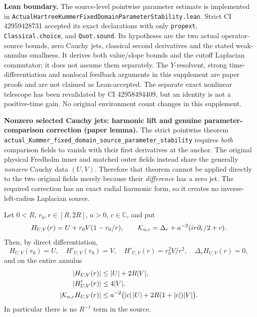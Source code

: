 \medskip
\noindent\textbf{Lean boundary.}
The source-level pointwise parameter estimate is implemented in
\texttt{ActualHartreeKummerFixedDomainParameterStability.lean}.
Strict CI 42959428731 accepted its exact declarations with only
\texttt{propext}, \texttt{Classical.choice}, and \texttt{Quot.sound}.
Its hypotheses are the two actual operator-source bounds, zero Cauchy
jets, classical second derivatives and the stated weak-annulus
smallness.  It derives both value/slope bounds and the cutoff Laplacian
commutator; it does not assume them separately.  The $Y$-resolvent,
strong time-differentiation and nonlocal feedback arguments in this
supplement are paper proofs and are not claimed as Lean-accepted.
The separate exact nonlinear telescope has been revalidated by
CI 42958494409, but an identity is not a positive-time gain.
No original environment count changes in this supplement.


\medskip
\noindent\textbf{Nonzero selected Cauchy jets: harmonic lift and genuine
parameter-comparison correction (paper lemma).}
The strict pointwise theorem
\texttt{actual\_Kummer\_fixed\_domain\_source\_parameter\_stability}
requires \emph{both} comparison fields to vanish with their first
derivatives at the anchor. The original physical Fredholm inner and
matched outer fields instead share the generally \emph{nonzero}
Cauchy data $(U,V)$. Therefore that theorem cannot be applied directly
to the two original fields merely because their \emph{difference}
has a zero jet. The required correction has an exact radial harmonic
form, so it creates no inverse-left-radius Laplacian source.

Let $0<R$, $r_0,r\in[R,2R]$, $a>0$, $c\in\mathbb C$, and put
\[
 H_{U,V}(r)=U+r_0V(1-r_0/r),\qquad
 {\cal K}_{a,c}=\Delta_r+a^{-2}(ir\partial_r/2+c).
\]
Then, by direct differentiation,
\[
 H_{U,V}(r_0)=U,\quad H'_{U,V}(r_0)=V,\quad
 H'_{U,V}(r)=r_0^2V/r^2,\quad
 \Delta_rH_{U,V}(r)=0,
\]
and on the entire annulus
\begin{align*}
 |H_{U,V}(r)|&\le |U|+2R|V|,\\
 |H'_{U,V}(r)|&\le4|V|,\\
 |{\cal K}_{a,c}H_{U,V}(r)|
 &\le a^{-2}\bigl(|c|\,|U|+
                       2R(1+|c|)|V|\bigr).
\end{align*}
In particular there is no $R^{-1}$ term in the source.

